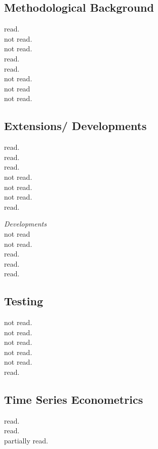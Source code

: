\subsection{Methodological Background}
\cite{abadie:2011} read.\\
\cite{abadie:2006} not read.\\
\cite{abadie:2002} not read.\\
\cite{doudchenko:2016} read. \\
\cite{ferman:2021} read.\\
\cite{frangakis:2002} not read.\\
\cite{rosenbaum:1983} not read \\
\cite{rubin:1974} not read.

\subsection{Extensions/ Developments}
\cite{abadie:2019} read.\\
\cite{amjad:2018} read.\\
\cite{benmichael:2021a} read.\\
\cite{benmichael:2021b} not read. \\
\cite{kellog:2021} not read. \\
\cite{kuosmanen:2021} not read.\\
\cite{muhlbach:2019} read.

\textit{Developments}\\
\cite{arkhangelsky:2021} not read\\
\cite{athey:2017} not read.\\
\cite{brodersen:2015} read. \\
\cite{brzeski:2015} read. \\
\cite{hartford:2017} read.

\subsection{Testing}
\cite{andrews:2003} not read. \\
\cite{cattaneo:2021} not read. \\
\cite{chernozhukov:2019} not read.\\
\cite{chernozhukov:2021} not read. \\
\cite{firpo:2018} not read. \\
\cite{hahn:2017} read.

\subsection{Time Series Econometrics}
\cite{martin:2012} read.\\
\cite{harvey:2020} read.\\
\cite{breitung:2021} partially read.

